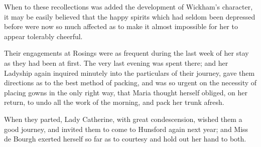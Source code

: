 When to these recollections was added the development of Wickham's character, it may be easily believed that the happy spirits which had seldom been depressed before were now so much affected as to make it almost impossible for her to appear tolerably cheerful.

Their engagements at Rosings were as frequent during the last week of her stay as they had been at first. The very last evening was spent there; and her Ladyship again inquired minutely into the particulars of their journey, gave them directions as to the best method of packing, and was so urgent on the necessity of placing gowns in the only right way, that Maria thought herself obliged, on her return, to undo all the work of the morning, and pack her trunk afresh.

When they parted, Lady Catherine, with great condescension, wished them a good journey, and invited them to come to Hunsford again next year; and Miss de Bourgh exerted herself so far as to courtesy and hold out her hand to both.